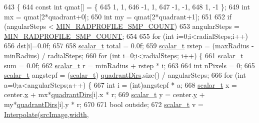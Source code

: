 \begin{DoxyCode}
643 \{
644     \textcolor{keyword}{const} \textcolor{keywordtype}{int} qmat[] = \{
645         1, 1,
646         -1, 1,
647         -1, -1,
648         1, -1 \};
649     \textcolor{keywordtype}{int} mx = qmat[2*quadrant+0];
650     \textcolor{keywordtype}{int} my = qmat[2*quadrant+1];
651 
652     \textcolor{keywordflow}{if} (angularSteps < \hyperlink{_queued_tracker_8h_a1625167c310599739f4d73170413e64a}{MIN\_RADPROFILE\_SMP\_COUNT})
653         angularSteps = \hyperlink{_queued_tracker_8h_a1625167c310599739f4d73170413e64a}{MIN\_RADPROFILE\_SMP\_COUNT};
654 
655     \textcolor{keywordflow}{for} (\textcolor{keywordtype}{int} i=0;i<radialSteps;i++)
656         dst[i]=0.0f;
657 
658     \hyperlink{scalar__types_8h_a03fcef84665498b9cfcf9c7cc25574e9}{scalar\_t} total = 0.0f;
659     \hyperlink{scalar__types_8h_a03fcef84665498b9cfcf9c7cc25574e9}{scalar\_t} rstep = (maxRadius - minRadius) / radialSteps;
660     \textcolor{keywordflow}{for} (\textcolor{keywordtype}{int} i=0;i<radialSteps; i++) \{
661         \hyperlink{scalar__types_8h_a03fcef84665498b9cfcf9c7cc25574e9}{scalar\_t} sum = 0.0f;
662         \hyperlink{scalar__types_8h_a03fcef84665498b9cfcf9c7cc25574e9}{scalar\_t} r = minRadius + rstep * i;
663 
664         \textcolor{keywordtype}{int} nPixels = 0;
665         \hyperlink{scalar__types_8h_a03fcef84665498b9cfcf9c7cc25574e9}{scalar\_t} angstepf = (\hyperlink{scalar__types_8h_a03fcef84665498b9cfcf9c7cc25574e9}{scalar\_t}) \hyperlink{class_c_p_u_tracker_ae155aab5f1ed07d8467818b915087b20}{quadrantDirs}.size() / angularSteps;
666         \textcolor{keywordflow}{for} (\textcolor{keywordtype}{int} a=0;a<angularSteps;a++) \{
667             \textcolor{keywordtype}{int} i = (int)angstepf * a;
668             \hyperlink{scalar__types_8h_a03fcef84665498b9cfcf9c7cc25574e9}{scalar\_t} x = center.\hyperlink{structvector2_a22b63498d8e4abf9a2da054a247965b9}{x} + mx*\hyperlink{class_c_p_u_tracker_ae155aab5f1ed07d8467818b915087b20}{quadrantDirs}[i].x * r;
669             \hyperlink{scalar__types_8h_a03fcef84665498b9cfcf9c7cc25574e9}{scalar\_t} y = center.\hyperlink{structvector2_a00b3268bc895adddf0b72d6acd8274a7}{y} + my*\hyperlink{class_c_p_u_tracker_ae155aab5f1ed07d8467818b915087b20}{quadrantDirs}[i].y * r;
670 
671             \textcolor{keywordtype}{bool} outside;
672             \hyperlink{scalar__types_8h_a03fcef84665498b9cfcf9c7cc25574e9}{scalar\_t} v = \hyperlink{utils_8h_aa9cfad3280334f04e799bb33b442f653}{Interpolate}(\hyperlink{class_c_p_u_tracker_a393778bc9b49eb6d5014fd814c5dfcdf}{srcImage},\hyperlink{class_c_p_u_tracker_afb77fe1c7e1a38d25d5aadded5a36fb9}{width},

\end{DoxyCode}
